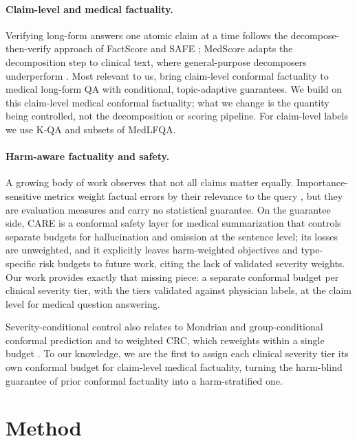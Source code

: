 \documentclass[11pt]{article}
\begin{document}
\paragraph{Claim-level and medical factuality.}
Verifying long-form answers one atomic claim at a time follows the
decompose-then-verify approach of FactScore \citep{min2023factscore} and SAFE
\citep{wei2024safe}; MedScore adapts the decomposition step to clinical text,
where general-purpose decomposers underperform \citep{huang2025medscore}. Most
relevant to us, \citet{cherian2024llm} bring claim-level conformal factuality to
medical long-form QA with conditional, topic-adaptive guarantees. We build on
this claim-level medical conformal factuality; what we change is the quantity
being controlled, not the decomposition or scoring pipeline. For claim-level
labels we use K-QA \citep{manes2024kqa} and subsets of MedLFQA.

\paragraph{Harm-aware factuality and safety.}
A growing body of work observes that not all claims matter equally.
Importance-sensitive metrics weight factual errors by their relevance to the
query \citep{wanner2025importance}, but they are evaluation measures and carry
no statistical guarantee. On the guarantee side, CARE \citep{bedi2026care} is a
conformal safety layer for medical summarization that controls separate budgets
for hallucination and omission at the sentence level; its losses are unweighted,
and it explicitly leaves harm-weighted objectives and type-specific risk budgets
to future work, citing the lack of validated severity weights. Our work provides
exactly that missing piece: a separate conformal budget per clinical severity
tier, with the tiers validated against physician labels, at the claim level for
medical question answering.

Severity-conditional control also relates to Mondrian and group-conditional
conformal prediction \citep{vovk2012conditional} and to weighted CRC, which
reweights within a single budget \citep{xu2024conformal}. To our knowledge, we
are the first to assign each clinical severity tier its own conformal budget for
claim-level medical factuality, turning the harm-blind guarantee of prior
conformal factuality into a harm-stratified one.


\section{Method}
\label{sec:method}
\end{document}
